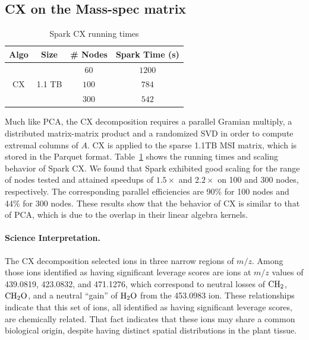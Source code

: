 \subsection{CX on the Mass-spec matrix}
\begin{table}[t]
\centering
\begin{tabular}{|c|c|c|c|} \hline
Algo & Size & \# Nodes & Spark Time (s)\\ \hline
\multirow{3}{*}{CX} & \multirow{3}{*}{1.1 TB} & $60$ & $1200$\\
{} & {} & $100$  & $784$\\
{} & {} & $300$ & $542$\\ \hline
\end{tabular}
\caption{Spark CX running times}
\label{tab:cxscale}
\end{table}
Much like PCA, the CX decomposition requires a parallel Gramian multiply, a distributed matrix-matrix product and a randomized SVD in order to compute extremal columns of $A$. CX is applied to the sparse 1.1TB MSI matrix, which is stored in the Parquet format. Table~\ref{tab:cxscale} shows the running times and scaling behavior of Spark CX. We found that Spark exhibited good scaling for the range of nodes tested and attained speedups of $1.5\times$ and $2.2\times$ on 100 and 300 nodes, respectively. The corresponding parallel efficiencies are 90\% for 100 nodes and 44\% for 300 nodes. These results show that the behavior of CX is similar to that of PCA, which is due to the overlap in their linear algebra kernels.

\paragraph{Science Interpretation.}
 The CX decomposition selected ions in three narrow regions of $m/z$. Among those ions identified as having significant leverage scores are ions at $m/z$ values of 439.0819, 423.0832, and 471.1276, which correspond to neutral losses of $\rm{CH_2}$, $\rm{CH_2O}$, and a neutral ``gain'' of $\rm{H_2O}$ from the 453.0983 ion.  These relationships indicate that this set of ions, all identified as having significant leverage scores, are chemically related.  That fact indicates that these ions may share a common biological origin, despite having distinct spatial distributions in the plant tissue.  

